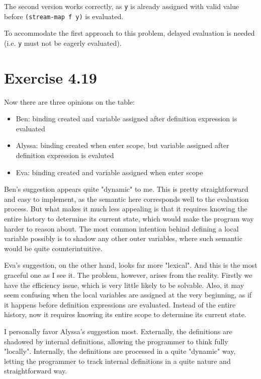 \documentclass[../main.tex]{subfiles}
\begin{document}
The second version works correctly, as \lstinline{y} is already assigned with valid value before \lstinline{(stream-map f y)} is evaluated.

To accommodate the first approach to this problem, delayed evaluation is needed (i.e. \lstinline{y} must not be eagerly evaluated).

\section{Exercise 4.19}

Now there are three opinions on the table:

\begin{itemize}
\item Ben: binding created and variable assigned after definition expression is evaluated
\item Alyssa: binding created when enter scope, but variable assigned after definition expression is evaluted
\item Eva: binding created and variable assigned when enter scope
\end{itemize}

Ben's suggestion appears quite "dynamic" to me. This is pretty straightforward and easy to implement, as the semantic here corresponds well to the evaluation process. But what makes it much less appealing is that it requires knowing the entire history to determine its current state, which would make the program way harder to reason about.
The most common intention behind defining a local variable possibly is to shadow any other outer variables, where such semantic would be quite counterintuitive.

Eva's suggestion, on the other hand, looks far more "lexical". And this is the most graceful one as I see it. The problem, however, arises from the reality. Firstly we have the efficiency issue, which is very little likely to be solvable. Also, it may seem confusing when the local variables are assigned at the very beginning, as if it happens before definition expressions are evaluated. Instead of the entire history, now it requires knowing its entire scope to determine its current state.

I personally favor Alyssa's suggestion most. Externally, the definitions are shadowed by internal definitions, allowing the programmer to think fully "locally". Internally, the definitions are processed in a quite "dynamic" way, letting the programmer to track internal definitions in a quite nature and straightforward way.
\end{document}
